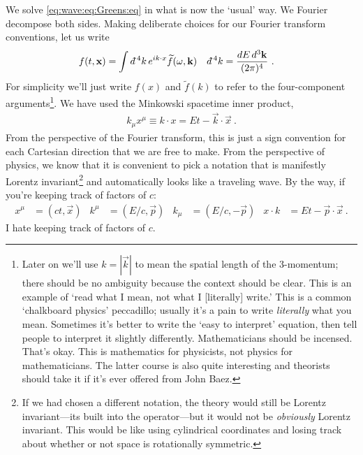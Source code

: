 We solve \eqref{eq:wave:eq:Greens:eq} in what is now the `usual' way. We Fourier decompose both sides. Making deliberate choices for our Fourier transform conventions, let us write
\begin{align}
	f(t,\vec{x}) &= \int \dbar^4k \, e^{ik\cdot x} \tilde f(\omega, \vec{k})
	&
	\dbar^4k &= \frac{dE\, d^3\vec{k}}{(2\pi)^4}
	 \ .
\end{align}
For simplicity we'll just write $f(x)$ and $\tilde f(k)$ to refer to the four-component arguments\footnote{Later on we'll use $k=|\vec{k}|$ to mean the spatial length of the 3-momentum; there should be no ambiguity because the context should be clear. This is an example of `read what I mean, not what I [literally] write.' This is a common `chalkboard physics' peccadillo; usually it's a pain to write \emph{literally} what you mean. Sometimes it's better to write the `easy to interpret' equation, then tell people to interpret it slightly differently. Mathematicians should be incensed. That's okay. This is mathematics for physicists, not physics for mathematicians. The latter course is also quite interesting and theorists should take it if it's ever offered from John Baez.}. 
We have used the Minkowski spacetime inner product,
\begin{align}
	k_\mu x^\mu \equiv k\cdot x = Et - \vec{k}\cdot\vec{x} \ .
\end{align}
From the perspective of the Fourier transform, this is just a sign convention for each Cartesian direction that we are free to make. From the perspective of physics, we know that it is convenient to pick a notation that is manifestly Lorentz invariant\footnote{If we had chosen a different notation, the theory would still be Lorentz invariant---its built into the operator---but it would not be \emph{obviously} Lorentz invariant. This would be like using cylindrical coordinates and losing track about whether or not space is rotationally symmetric.} and automatically looks like a traveling wave. By the way, if you're keeping track of factors of $c$:
\begin{align}
	x^\mu &= (ct,\vec{x})
	&
	k^\mu &= (E/c,\vec{p})
	&
	k_\mu &= (E/c, -\vec{p})
	&
	x\cdot k  &= Et - \vec{p}\cdot\vec{x} \ .
\end{align}
I hate keeping track of factors of $c$. 


